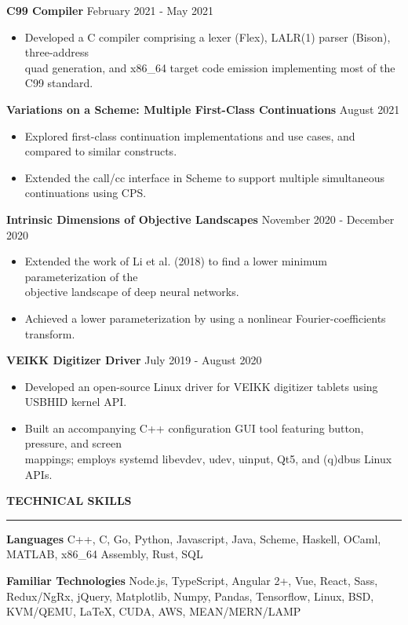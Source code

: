 \documentclass[]{article}
\newcommand{\br}{\vspace{10pt}}
\newcommand{\brs}{\vspace{3pt}}
\newcommand{\hr}{\vspace{4pt}\hrule\vspace{4pt}}
\begin{document}
\brs

\textbf{C99 Compiler}
\hfill
February 2021 - May 2021
\begin{itemize}
\item Developed a C compiler comprising a lexer (Flex), LALR(1) parser (Bison),
  three-address \\ quad generation, and x86\_64 target code emission
  implementing most of the C99 standard.
\end{itemize}

\brs

\textbf{Variations on a Scheme: Multiple First-Class Continuations}
\hfill
August 2021
\begin{itemize}
\item Explored first-class continuation implementations and use cases, and compared to similar constructs.
\item Extended the call/cc interface in Scheme to support multiple simultaneous continuations using CPS.
\end{itemize}

\brs

\textbf{Intrinsic Dimensions of Objective Landscapes}
\hfill
November 2020 - December 2020
\begin{itemize}
\item Extended the work of Li et al. (2018) to find a lower minimum parameterization of the \\
  objective landscape of deep neural networks.
\item Achieved a lower parameterization by using a nonlinear Fourier-coefficients transform.
\end{itemize}

\brs

\textbf{VEIKK Digitizer Driver}
\hfill
July 2019 - August 2020
\begin{itemize}
\item Developed an open-source Linux driver for VEIKK digitizer tablets using USBHID kernel
  API.
\item Built an accompanying C++ configuration GUI tool featuring button, pressure, and screen \\
  mappings; employs systemd libevdev, udev, uinput, Qt5, and (q)dbus Linux APIs.
\end{itemize}

\br

\textbf{TECHNICAL SKILLS}
\hr

\textbf{Languages} C++, C, Go, Python, Javascript, Java, Scheme, Haskell, OCaml,
MATLAB, x86\_64 Assembly, Rust, SQL

\brs

\textbf{Familiar Technologies} Node.js, TypeScript, Angular 2+, Vue, React,
Sass, Redux/NgRx, jQuery, Matplotlib, Numpy, Pandas, Tensorflow, Linux, BSD,
KVM/QEMU, \LaTeX, CUDA, AWS, MEAN/MERN/LAMP
\end{document}
